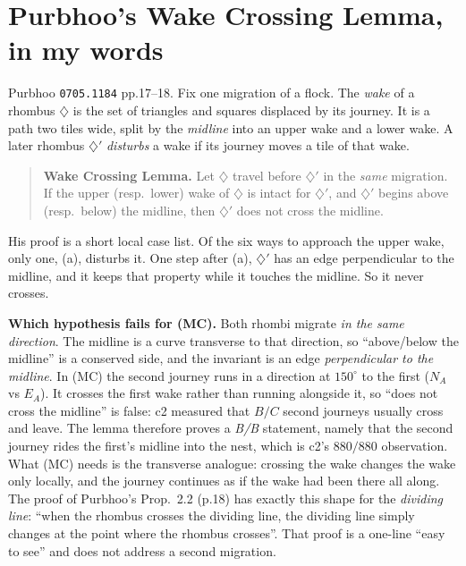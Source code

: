 \documentclass[11pt]{article}
\theoremstyle{definition}
\begin{document}
\section{Purbhoo's Wake Crossing Lemma, in my words}
Purbhoo \texttt{0705.1184} pp.17--18. Fix one migration of a flock. The \emph{wake} of a rhombus $\diamondsuit$ is the set of
triangles and squares displaced by its journey. It is a path two tiles wide, split by the \emph{midline} into an upper wake and a lower wake.
A later rhombus $\diamondsuit'$ \emph{disturbs} a wake if its journey moves a tile of that wake.
\begin{quote}\textbf{Wake Crossing Lemma.} Let $\diamondsuit$ travel before $\diamondsuit'$ in the \emph{same} migration. If the upper
(resp.\ lower) wake of $\diamondsuit$ is intact for $\diamondsuit'$, and $\diamondsuit'$ begins above (resp.\ below) the midline, then
$\diamondsuit'$ does not cross the midline.\end{quote}
His proof is a short local case list. Of the six ways to approach the upper wake, only one, (a), disturbs it. One step after (a),
$\diamondsuit'$ has an edge perpendicular to the midline, and it keeps that property while it touches the midline. So it never crosses.

\textbf{Which hypothesis fails for (MC).} Both rhombi migrate \emph{in the same direction}. The midline is a curve transverse to that
direction, so ``above/below the midline'' is a conserved side, and the invariant is an edge \emph{perpendicular to the midline}. In (MC)
the second journey runs in a direction at $150^\circ$ to the first ($N_A$ vs $E_A$). It crosses the first wake rather than running
alongside it, so ``does not cross the midline'' is false: c2 measured that $B/C$ second journeys usually cross and leave. The lemma
therefore proves a \emph{B/B} statement, namely that the second journey rides the first's midline into the nest, which is c2's $880/880$
observation. What (MC) needs is the transverse analogue: crossing the wake changes the wake only locally, and the journey continues as if
the wake had been there all along. The proof of Purbhoo's Prop.~2.2 (p.18) has exactly this shape for the \emph{dividing line}: ``when the
rhombus crosses the dividing line, the dividing line simply changes at the point where the rhombus crosses''. That proof is a one-line
``easy to see'' and does not address a second migration.
\end{document}
